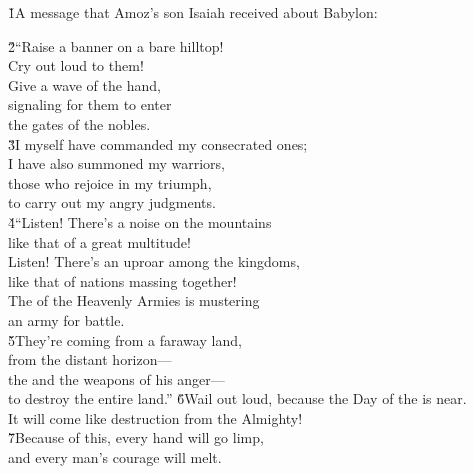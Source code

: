 \v{1}A message that Amoz's son Isaiah received about Babylon:

\begin{poetry}
\poeml \v{2}``Raise a banner on a bare hilltop! \\
\poemll    Cry out loud to them! \\
\poeml Give a wave of the hand, \\
\poemll    signaling for them to enter \\
\poemlll       the gates of the nobles. \\
\poeml \v{3}I myself have commanded my consecrated ones; \\
\poemll    I have also summoned my warriors, \\
\poeml those who rejoice in my triumph, \\
\poemll    to carry out my angry judgments. \\
\poeml \v{4}``Listen! There's a noise on the mountains \\
\poemll    like that of a great multitude! \\
\poeml Listen! There's an uproar among the kingdoms, \\
\poemll    like that of nations massing together! \\
\poeml The  of the Heavenly Armies is mustering \\
\poemll    an army for battle. \\
\poeml \v{5}They're coming from a faraway land, \\
\poemll    from the distant horizon--- \\
\poeml the  and the weapons of his anger--- \\
\poemll    to destroy the entire land.''
\poeml \v{6}Wail out loud, because the Day of the  is near. \\
\poemll    It will come like destruction from the Almighty! \\
\poeml \v{7}Because of this, every hand will go limp, \\
\poemll    and every man's courage will melt. \\

\end{poetry}
